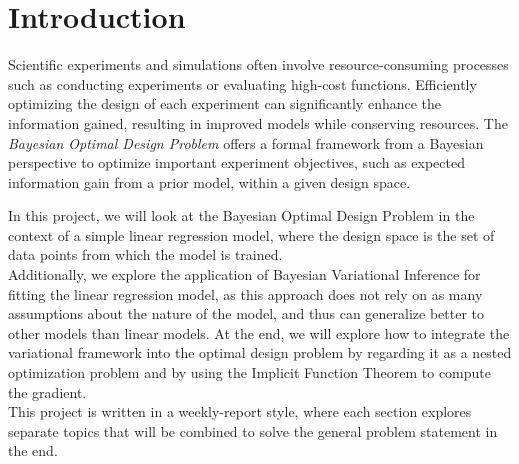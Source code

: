 \section{Introduction}
Scientific experiments and simulations often involve resource-consuming processes such as conducting experiments or evaluating high-cost functions. 
Efficiently optimizing the design of each experiment can significantly enhance the information gained, resulting in improved models while conserving resources. 
The \textit{Bayesian Optimal Design Problem} offers a formal framework from a Bayesian perspective to optimize important experiment objectives, 
such as expected information gain from a prior model, within a given design space\cite{ryan15}.

In this project, we will look at the Bayesian Optimal Design Problem in the context of a simple linear regression model, 
where the design space is the set of data points from which the model is trained.\\
Additionally, we explore the application of Bayesian Variational Inference for fitting the linear regression model, 
as this approach does not rely on as many assumptions about the nature of the model, and thus can generalize better to other models than linear models.
At the end, we will explore how to integrate the variational framework into the optimal design problem
by regarding it as a nested optimization problem and by using the Implicit Function Theorem to compute the gradient.\\
This project is written in a weekly-report style, where each section explores separate topics that will be combined to solve the general problem statement in the end.

